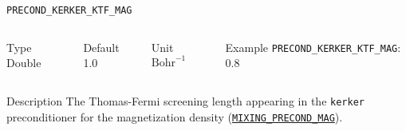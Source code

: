 \begin{frame}[allowframebreaks]{\texttt{PRECOND\_KERKER\_KTF\_MAG}} \label{PRECOND_KERKER_KTF_MAG}
\vspace*{-12pt}
\begin{columns}
\begin{block}{Type}
Double
\end{block}

\begin{block}{Default}
1.0
\end{block}

\begin{block}{Unit}
$\textrm{Bohr}^{-1}$
\end{block}

\begin{block}{Example}
\texttt{PRECOND\_KERKER\_KTF\_MAG}: 0.8
\end{block}
\end{columns}

\begin{block}{Description}
The Thomas-Fermi screening length appearing in the \texttt{kerker} preconditioner for the magnetization density (\hyperlink{MIXING_PRECOND_MAG}{\texttt{MIXING\_PRECOND\_MAG}}). 
\end{block}

\end{frame}



